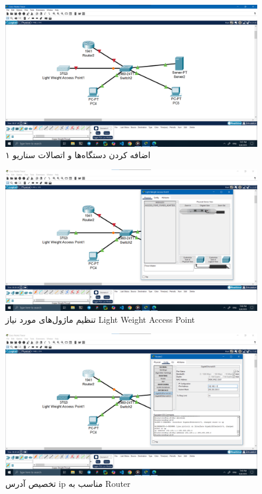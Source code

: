 \documentclass[12pt]{article}
\begin{document}
	\begin{figure}[H]
		\centering
		\includegraphics[width=\textwidth]{resources/scenario1-1.png}
		\caption{اضافه کردن دستگاه‌ها و اتصالات سناریو ۱}
		\label{1:1}
	\end{figure}
	\begin{figure}[H]
		\centering
		\includegraphics[width=\textwidth]{resources/scenario1-2.png}
		\caption{تنظیم ماژول‌های مورد نیاز \textenglish{Light Weight Access Point}}
		\label{1:2}
	\end{figure}
	\begin{figure}[H]
		\centering
		\includegraphics[width=\textwidth]{resources/scenario1-3.png}
		\caption{تخصیص آدرس \textenglish{ip} مناسب به \textenglish{Router}}
		\label{1:3}
	\end{figure}
\end{document}
